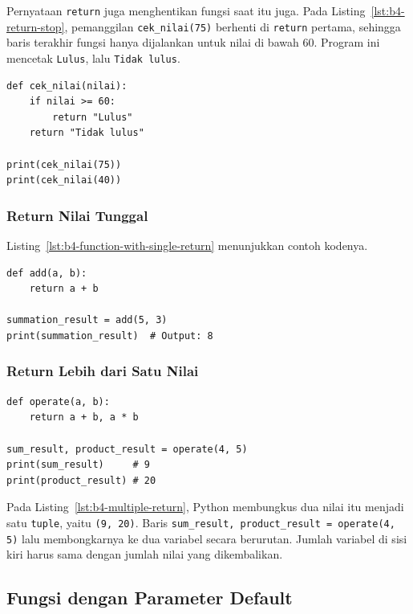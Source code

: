 Pernyataan \texttt{return} juga menghentikan fungsi saat itu juga. Pada Listing~\ref{lst:b4-return-stop}, pemanggilan \texttt{cek_nilai(75)} berhenti di \texttt{return} pertama, sehingga baris terakhir fungsi hanya dijalankan untuk nilai di bawah 60. Program ini mencetak \texttt{Lulus}, lalu \texttt{Tidak lulus}.

\begin{lstlisting}[style=PythonStyle, caption={Kode Python: return_berhenti.py}, label={lst:b4-return-stop}]
def cek_nilai(nilai):
    if nilai >= 60:
        return "Lulus"
    return "Tidak lulus"

print(cek_nilai(75))
print(cek_nilai(40))
\end{lstlisting}

\subsubsection{Return Nilai Tunggal}
Listing~\ref{lst:b4-function-with-single-return} menunjukkan contoh kodenya.

\begin{lstlisting}[style=PythonStyle, caption={Kode Python: function_with_single_return.py}, label={lst:b4-function-with-single-return}]
def add(a, b):
    return a + b

summation_result = add(5, 3)
print(summation_result)  # Output: 8
\end{lstlisting}

\subsubsection{Return Lebih dari Satu Nilai}
\begin{lstlisting}[style=PythonStyle, caption={Kode Python: function_with_multiple_return.py}, label={lst:b4-multiple-return}]
def operate(a, b):
    return a + b, a * b

sum_result, product_result = operate(4, 5)
print(sum_result)     # 9
print(product_result) # 20
\end{lstlisting}

Pada Listing~\ref{lst:b4-multiple-return}, Python membungkus dua nilai itu menjadi satu \texttt{tuple}, yaitu \texttt{(9, 20)}. Baris \texttt{sum_result, product_result = operate(4, 5)} lalu membongkarnya ke dua variabel secara berurutan. Jumlah variabel di sisi kiri harus sama dengan jumlah nilai yang dikembalikan.

\subsection{Fungsi dengan Parameter Default}

